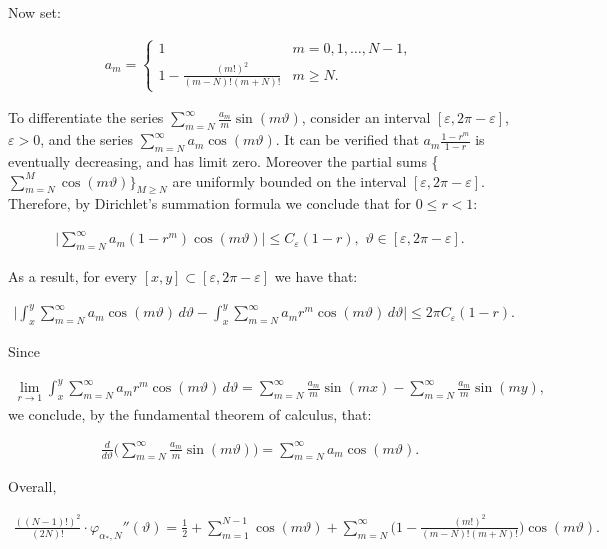 \documentclass{amsart}[11pt]
\newcommand{\sbs}{\subset} %
\newcommand{\eps}{\varepsilon}
\newcommand{\vphi}{\varphi}
\newcommand{\vth}{\vartheta}
\newcommand{\ra}{\rightarrow}
\theoremstyle{definition}
\begin{document}
Now set:

\begin{gather*}
    a_m = 
\begin{cases}
    1 & m = 0,1,\ldots,N-1, \\
    1- \frac{(m!)^2}{(m-N)!(m+N)!} & m \geq N.
\end{cases}
\end{gather*}

To differentiate the series $\sum_{m = N}^{\infty}\frac{a_m}{m} \sin(m \vth)$, consider an interval $[\eps, 2\pi - \eps]$, $\eps >0$, and the series $\sum_{m = N}^{\infty}a_m \cos(m \vth)$. It can be verified that $a_m\frac{1-r^m}{1-r}$ is eventually decreasing, and has limit zero. Moreover the partial sums \{ $\sum_{m=N}^{M}\cos(m \vth)\}_{M \geq N}$ are uniformly bounded on the interval $[\eps, 2\pi - \eps]$. Therefore, by Dirichlet's summation formula we conclude that for $0 \leq r < 1$: 

\begin{gather*}
    \bigg| \sum_{m=N}^{\infty}a_m (1-r^m)\cos(m \vth) \bigg| \leq C_{\eps} (1-r), \,\, \vth \in [\eps, 2\pi - \eps].
\end{gather*}

As a result, for every $[x,y] \sbs [\eps,2\pi - \eps]$ we have that:

\begin{gather*}
    \bigg| \int_x^y \sum_{m=N}^{\infty}a_m\cos(m \vth) \, d\vth - \int_x^y \sum_{m=N}^{\infty}a_m r^m \cos(m \vth) \, d\vth\bigg| \leq 2\pi C_{\eps} (1-r).
\end{gather*}

Since 

\begin{gather*}
\lim_{r \ra 1} \int_x^y  \sum_{m=N}^{\infty}a_m r^m \cos(m \vth) \, d\vth = \sum_{m=N}^{\infty}\frac{a_m}{m} \sin(m x) -  \sum_{m=N}^{\infty}\frac{a_m}{m} \sin(m y),
\end{gather*}
we conclude, by the fundamental theorem of calculus, that:

\begin{gather*}
\frac{d}{d\vth} \bigg( \sum_{m=N}^{\infty}\frac{a_m}{m} \sin(m \vth)\bigg) = \sum_{m = N}^{\infty} a_m \cos(m \vth).
\end{gather*}

Overall,

\begin{gather*}
   \frac{((N-1)!)^2}{(2N)!} \cdot  \vphi_{\alpha_{\ast},N} ''(\vth) = \frac{1}{2} + \sum_{m=1}^{N-1} \cos(m \vth) + \sum_{m=N}^{\infty} \bigg( 1- \frac{(m!)^2}{(m-N)!(m+N)!}\bigg)\cos(m\vth).
\end{gather*}
\end{document}
